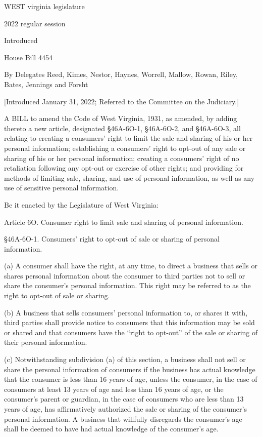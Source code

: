 WEST virginia legislature

2022 regular session

Introduced

House Bill 4454

By Delegates Reed, Kimes, Nestor, Haynes, Worrell, Mallow, Rowan, Riley, Bates, Jennings and Forsht

[Introduced January 31, 2022; Referred to
the Committee on the Judiciary.]

A BILL to amend the Code of West Virginia, 1931, as amended, by adding thereto a new article, designated §46A-6O-1, §46A-6O-2, and §46A-6O-3, all relating to creating a consumers’ right to limit the sale and sharing of his or her personal information; establishing a consumers’ right to opt-out of any sale or sharing of his or her personal information; creating a consumers’ right of no retaliation following any opt-out or exercise of other rights; and providing for methods of limiting sale, sharing, and use of personal information, as well as any use of sensitive personal information.

Be it enacted by the Legislature of West Virginia:

Article  6O. Consumer right to limit sale and sharing of personal information.


§46A-6O-1. Consumers’ right to opt-out of sale or sharing of personal information.

(a) A consumer shall have the right, at any time, to direct a business that sells or shares personal information about the consumer to third parties not to sell or share the consumer’s personal information. This right may be referred to as the right to opt-out of sale or sharing.

(b) A business that sells consumers’ personal information to, or shares it with, third parties shall provide notice to consumers that this information may be sold or shared and that consumers have the “right to opt-out” of the sale or sharing of their personal information.

(c) Notwithstanding subdivision (a) of this section, a business shall not sell or share the personal information of consumers if the business has actual knowledge that the consumer is less than 16 years of age, unless the consumer, in the case of consumers at least 13 years of age and less than 16 years of age, or the consumer’s parent or guardian, in the case of consumers who are less than 13 years of age, has affirmatively authorized the sale or sharing of the consumer’s personal information. A business that willfully disregards the consumer’s age shall be deemed to have had actual knowledge of the consumer’s age.

